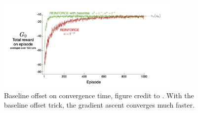 \documentclass[11pt]{article}
\begin{document}
\begin{figure}[H]
    \centering
    \includegraphics[width=0.8\textwidth]{baseline.png}
    \caption{Baseline offset on convergence time, figure credit to \cite{sutton2018reinforcement}. With the baseline offset trick, the gradient ascent converges much faster.}
    \label{fig:my_label}
\end{figure}
\end{document}
